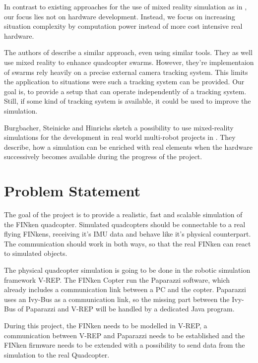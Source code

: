 In contrast to existing approaches for the use of mixed reality simulation as in \cite{Chen2011}, our focus lies not on hardware development.
Instead, we focus on increasing situation complexity by computation power instead of more cost intensive real hardware.

The authors of  \cite{Honig2015} describe a similar approach, even using similar tools. 
They as well use mixed reality to enhance quadcopter swarms.
However, they're implementaion of swarms rely heavily on a precise external camera tracking system. 
This limits the application to situations were such a tracking system can be provided.
Our goal is, to provide a setup that can operate independently of a tracking system.
Still, if some kind of tracking system is available, it could be used to improve the simulation.

Burgbacher, Steinicke and Hinrichs sketch a possibility to use mixed-reality simulations for the development in real world multi-robot projects in \cite{Burgbacher2011}.
They describe, how a simulation can be enriched with real elements when the hardware successively becomes available during the progress of the project.


       


  
\section{Problem Statement}
\label{sec:problem}
    The goal of the project is to provide a realistic, fast and scalable simulation of the FINken quadcopter.  
    Simulated quadcopters should be connectable to a real flying FINkens, receiving it's    
    \gls{IMU} data and behave like it's physical counterpart. 
    The communication should work in both ways, so that the real FINken can react to simulated objects.

The physical quadcopter simulation is going to be done in the robotic simulation framework V-REP\cite{vrep}. 
The FINken Copter run the Paparazzi\cite{pprz} software, which already includes a communication link between a PC and the copter. 
Paparazzi uses an Ivy-Bus as a communication link, so the missing part between the Ivy-Bus of Paparazzi and V-REP will be handled by a dedicated Java program.

During this project, the FINken needs to be modelled in V-REP, a communication between V-REP and Paparazzi needs to be established and the FINken firmware needs to be extended with a possibility to send data from the simulation to the real Quadcopter.
 
